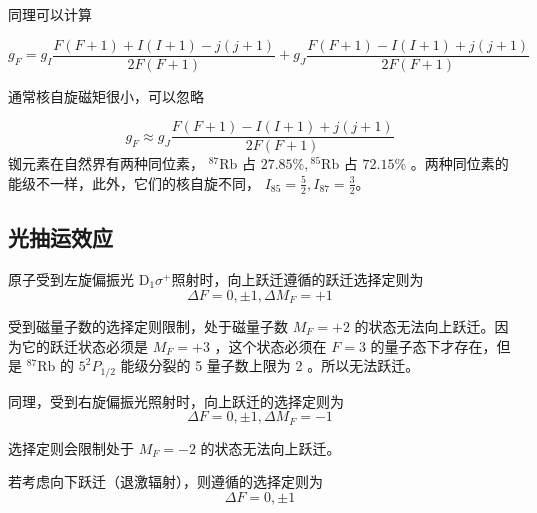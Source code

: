 \documentclass[10pt,hyperref,a4paper,UTF8]{ctexart}
\begin{document}
        同理可以计算

        \begin{equation}
        g_{F}=g_{I} \frac{F(F+1)+I(I+1)-j(j+1)}{2 F(F+1)}+g_{J} \frac{F(F+1)-I(I+1)+j(j+1)}{2 F(F+1)}
        \end{equation}

        通常核自旋磁矩很小，可以忽略

        \begin{equation}
        g_{F} \approx g_{J} \frac{F(F+1)-I(I+1)+j(j+1)}{2 F(F+1)}
        \end{equation}
        铷元素在自然界有两种同位素， ${ }^{87} \mathrm{Rb}$ 占 $27.85 \%,{ }^{85} \mathrm{Rb}$ 占 $72.15 \%$ 。两种同位素的能级不一样，此外，它们的核自旋不同， $I_{85}=\frac{5}{2}, I_{87}=\frac{3}{2}$\cite{Mora_2018}。

        \subsection{光抽运效应}
                原子受到左旋偏振光 $\mathrm{D}_{1} \sigma^{+}$照射时，向上跃迁遵循的跃迁选择定则为
                \begin{equation}
                \Delta F=0, \pm 1, \Delta M_{F}=+1
                \end{equation}

                受到磁量子数的选择定则限制，处于磁量子数 $M_{F}=+2$ 的状态无法向上跃迁。因为它的跃迁状态必须是 $M_{F}=+3$ ，这个状态必须在 $F=3$ 的量子态下才存在，但是 ${ }^{87} \mathrm{Rb}$ 的 $5^{2} P_{1 / 2}$ 能级分裂的 5 量子数上限为 2 。所以无法跃迁。

                同理，受到右旋偏振光照射时，向上跃迁的选择定则为
                \begin{equation}
                \Delta F=0, \pm 1, \Delta M_{F}=-1
                \end{equation}

                选择定则会限制处于 $M_{F}=-2$ 的状态无法向上跃迁。

                若考虑向下跃迁（退激辐射），则遵循的选择定则为
                \begin{equation}
                \Delta F=0, \pm 1
                \end{equation}
\end{document}
